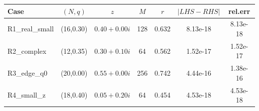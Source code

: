 \begin{tabular}{lcccccc}
\toprule
Case & $(N,q)$ & $z$ & $M$ & $r$ & $|LHS-RHS|$ & rel.err \\
\midrule
R1\_real\_small & (16,0.30) & $0.40+0.00i$ & 128 & 0.632 & 8.13e-18 & 8.13e-18 \\
R2\_complex & (12,0.35) & $0.30+0.10i$ & 64 & 0.562 & 1.52e-17 & 1.52e-17 \\
R3\_edge\_q0 & (20,0.00) & $0.55+0.00i$ & 256 & 0.742 & 4.44e-16 & 1.38e-16 \\
R4\_small\_z & (18,0.40) & $0.05+0.20i$ & 64 & 0.454 & 4.53e-18 & 4.53e-18 \\
\bottomrule
\end{tabular}